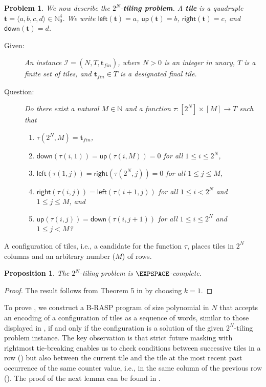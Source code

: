 \documentclass{article} %
\newtheorem{proposition}[theorem]{Proposition}
\newtheorem{problem}[theorem]{Problem}
\newcommand{\N}{\mathbb{N}}
\newcommand{\tleft}{\mathsf{left}}
\newcommand{\tright}{\mathsf{right}}
\newcommand{\tup}{\mathsf{up}}
\newcommand{\tdown}{\mathsf{down}}
\newcommand{\defn}[1]{\textbf{#1}}
\newcommand{\TI}{\mathcal{I}}
\newcommand{\tile}{\boldsymbol{t}}
\newcommand{\tileset}{T}
\newcommand{\tilefin}{\boldsymbol{t}_{\mathit{fin}}}
\begin{document}
\begin{problem}\label{prob:tiling}
We now describe the $2^N$-\defn{tiling problem}.
A \defn{tile} is a quadruple $\tile = \langle a, b, c, d \rangle \in \N_0^4$. We write $\tleft(\tile) = a$, $\tup(\tile) = b$, $\tright(\tile) = c$, and $\tdown(\tile) = d$.
\begin{description}
\item[Given:] An instance $\TI = (N, \tileset, \tilefin)$, where $N > 0$ is an integer in unary, $\tileset$ is a finite set of tiles, and $\tilefin \in \tileset$ is a designated final tile.
\item[Question:] Do there exist a natural $M \in \mathbb{N}$ and a function $\tau \colon [2^N] \times [M] \to \tileset$ such that
\begin{enumerate}
\item $\tau(2^N,M) = \tilefin$, \label{itm:t-fin}
\item $\tdown(\tau(i,1)) = \tup(\tau(i,M)) = 0$ for all $1 \le i \le 2^N$, \label{itm:bot-top}
\item $\tleft(\tau(1,j)) = \tright(\tau(2^N,j)) = 0$ for all $1 \le j \le M$, \label{itm:first-last}
\item $\tright(\tau(i,j)) = \tleft(\tau(i+1,j))$ for all $1 \le i < 2^N$ and $1 \le j \le M$, and \label{itm:right-left}
\item $\tup(\tau(i,j)) = \tdown(\tau(i,j+1))$ for all $1 \le i \le 2^N$ and $1 \le j < M$? \label{itm:up-down}
\end{enumerate}
\end{description}
\end{problem}
A configuration of tiles, i.e., a candidate for the function $\tau$, places tiles in $2^N$ columns and an arbitrary number ($M$) of rows.

\begin{proposition}\label{prop:tiling}
The $2^N$-tiling problem is $\EXPSPACE$-complete.
\end{proposition}
\begin{proof}
The result follows from Theorem 5 in \citet{Schwarzentruber19} by choosing $k=1$.
\end{proof}
To prove , we construct a B-RASP program of size polynomial in $N$ that
accepts an encoding of a configuration of tiles as a sequence of words, similar to those displayed in ,
if and only if the configuration is a solution of the given $2^N$-tiling problem instance.
The key observation is that strict future masking with rightmost tie-breaking
enables us to check conditions between successive tiles in a row ()
but also between the current tile and the tile at the most recent past occurrence of the same counter value, i.e., in the same column of the previous row ().
The proof of the next lemma can be found in .
\end{document}
